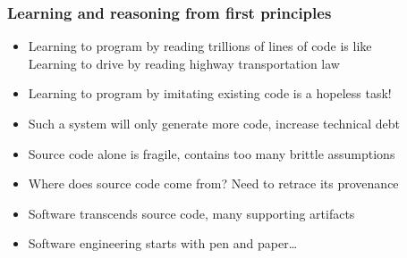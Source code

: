 \documentclass{beamer}
\begin{document}
  \begin{frame}
    \frametitle{Learning and reasoning from first principles}
    \begin{itemize}
      \item Learning to program by reading trillions of lines of code is like
          \\Learning to drive by reading highway transportation law
      \item Learning to program by imitating existing code is a hopeless task!
      \item Such a system will only generate more code, increase technical debt
      \item Source code alone is fragile, contains too many brittle assumptions
      \item Where does source code come from? Need to retrace its provenance
      \item Software transcends source code, many supporting artifacts
      \item Software engineering starts with pen and paper\ldots
    \end{itemize}
    \begin{figure}[H]
      \centering


    \end{figure}
  \end{frame}
\end{document}
